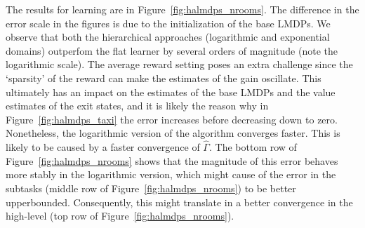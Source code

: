  The results for learning are in Figure~\ref{fig:halmdps_nrooms}. The difference in the error scale in the figures is due to the initialization of the base LMDPs. We observe that both the hierarchical approaches (logarithmic and exponential domains) outperfom the flat learner by several orders of magnitude (note the logarithmic scale).  The average reward setting poses an extra challenge since the `sparsity' of the reward can make the estimates of the gain oscillate. This ultimately has an impact on the estimates of the base LMDPs and the value estimates of the exit states, and it is likely the reason why in Figure~\ref{fig:halmdps_taxi} the error increases before decreasing down to zero. Nonetheless, the logarithmic version of the algorithm converges faster. This is likely to be caused by a faster convergence of $\widehat \Gamma$. The bottom row of Figure~\ref{fig:halmdps_nrooms} shows that the magnitude of this error behaves more stably in the logarithmic version, which might cause of the error in the subtasks (middle row of Figure~\ref{fig:halmdps_nrooms}) to be better upperbounded. Consequently, this might translate in a better convergence in the high-level (top row of Figure~\ref{fig:halmdps_nrooms}).

